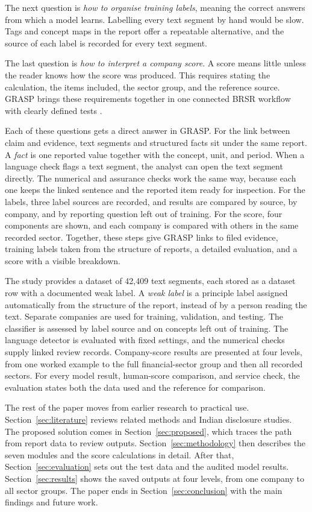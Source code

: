 The next question is \emph{how to organise training labels}, meaning the correct answers from which a model learns. Labelling every text segment by hand would be slow. Tags and concept maps in the report offer a repeatable alternative, and the source of each label is recorded for every text segment.

The last question is \emph{how to interpret a company score}. A score means little unless the reader knows how the score was produced. This requires stating the calculation, the items included, the sector group, and the reference source. GRASP brings these requirements together in one connected BRSR workflow with clearly defined tests \cite{calamai2025,garg2025}.

Each of these questions gets a direct answer in GRASP. For the link between claim and evidence, text segments and structured facts sit under the same report. A \emph{fact} is one reported value together with the concept, unit, and period. When a language check flags a text segment, the analyst can open the text segment directly. The numerical and assurance checks work the same way, because each one keeps the linked sentence and the reported item ready for inspection. For the labels, three label sources are recorded, and results are compared by source, by company, and by reporting question left out of training. For the score, four components are shown, and each company is compared with others in the same recorded sector. Together, these steps give GRASP links to filed evidence, training labels taken from the structure of reports, a detailed evaluation, and a score with a visible breakdown.

The study provides a dataset of 42,409 text segments, each stored as a dataset row with a documented weak label. A \emph{weak label} is a principle label assigned automatically from the structure of the report, instead of by a person reading the text. Separate companies are used for training, validation, and testing. The classifier is assessed by label source and on concepts left out of training. The language detector is evaluated with fixed settings, and the numerical checks supply linked review records. Company-score results are presented at four levels, from one worked example to the full financial-sector group and then all recorded sectors. For every model result, human-score comparison, and service check, the evaluation states both the data used and the reference for comparison.

The rest of the paper moves from earlier research to practical use. Section~\ref{sec:literature} reviews related methods and Indian disclosure studies. The proposed solution comes in Section~\ref{sec:proposed}, which traces the path from report data to review outputs. Section~\ref{sec:methodology} then describes the seven modules and the score calculations in detail. After that, Section~\ref{sec:evaluation} sets out the test data and the audited model results. Section~\ref{sec:results} shows the saved outputs at four levels, from one company to all sector groups. The paper ends in Section~\ref{sec:conclusion} with the main findings and future work.